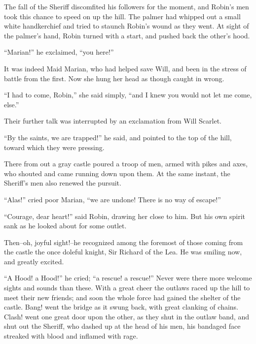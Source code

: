 The fall of the Sheriff discomfited his followers for the moment, and
Robin's men took this chance to speed on up the hill. The palmer had
whipped out a small white handkerchief and tried to staunch Robin's
wound as they went. At sight of the palmer's hand, Robin turned with a
start, and pushed back the other's hood.

``Marian!'' he exclaimed, ``you here!''

It was indeed Maid Marian, who had helped save Will, and been in the
stress of battle from the first. Now she hung her head as though caught
in wrong.

``I had to come, Robin,'' she said simply, ``and I knew you would not
let me come, else.''

Their further talk was interrupted by an exclamation from Will Scarlet.

``By the saints, we are trapped!'' he said, and pointed to the top of
the hill, toward which they were pressing.

There from out a gray castle poured a troop of men, armed with pikes and
axes, who shouted and came running down upon them. At the same instant,
the Sheriff's men also renewed the pursuit.

``Alas!'' cried poor Marian, ``we are undone! There is no way of
escape!''

``Courage, dear heart!'' said Robin, drawing her close to him. But his
own spirit sank as he looked about for some outlet.

Then--oh, joyful sight!--he recognized among the foremost of those
coming from the castle the once doleful knight, Sir Richard of the Lea.
He was smiling now, and greatly excited.

``A Hood! a Hood!'' he cried; ``a rescue! a rescue!'' Never were there
more welcome sights and sounds than these. With a great cheer the
outlaws raced up the hill to meet their new friends; and soon the whole
force had gained the shelter of the castle. Bang! went the bridge as it
swung back, with great clanking of chains. Clash! went one great door
upon the other, as they shut in the outlaw band, and shut out the
Sheriff, who dashed up at the head of his men, his bandaged face
streaked with blood and inflamed with rage.
